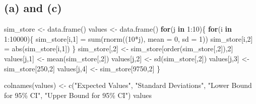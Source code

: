 \documentclass[
]{article}
\author{}
\date{\vspace{-2.5em}}
\newenvironment{Shaded}{\begin{snugshade}}{\end{snugshade}}
\newcommand{\AttributeTok}[1]{\textcolor[rgb]{0.77,0.63,0.00}{#1}}
\newcommand{\ControlFlowTok}[1]{\textcolor[rgb]{0.13,0.29,0.53}{\textbf{#1}}}
\newcommand{\DecValTok}[1]{\textcolor[rgb]{0.00,0.00,0.81}{#1}}
\newcommand{\FunctionTok}[1]{\textcolor[rgb]{0.00,0.00,0.00}{#1}}
\newcommand{\NormalTok}[1]{#1}
\newcommand{\OtherTok}[1]{\textcolor[rgb]{0.56,0.35,0.01}{#1}}
\newcommand{\SpecialCharTok}[1]{\textcolor[rgb]{0.00,0.00,0.00}{#1}}
\newcommand{\StringTok}[1]{\textcolor[rgb]{0.31,0.60,0.02}{#1}}
\begin{document}
\subsection*{(a) and (c)}

\begin{Shaded}
\begin{Highlighting}[]
\NormalTok{sim\_store }\OtherTok{\textless{}{-}} \FunctionTok{data.frame}\NormalTok{()}
\NormalTok{values }\OtherTok{\textless{}{-}} \FunctionTok{data.frame}\NormalTok{()}
\ControlFlowTok{for}\NormalTok{(j }\ControlFlowTok{in} \DecValTok{1}\SpecialCharTok{:}\DecValTok{10}\NormalTok{)\{}
  \ControlFlowTok{for}\NormalTok{(i }\ControlFlowTok{in} \DecValTok{1}\SpecialCharTok{:}\DecValTok{10000}\NormalTok{)\{}
\NormalTok{    sim\_store[i,}\DecValTok{1}\NormalTok{] }\OtherTok{=} \FunctionTok{sum}\NormalTok{(}\FunctionTok{rnorm}\NormalTok{((}\DecValTok{10}\SpecialCharTok{*}\NormalTok{j), }\AttributeTok{mean =} \DecValTok{0}\NormalTok{, }\AttributeTok{sd =} \DecValTok{1}\NormalTok{))}
\NormalTok{    sim\_store[i,}\DecValTok{2}\NormalTok{] }\OtherTok{=} \FunctionTok{abs}\NormalTok{(sim\_store[i,}\DecValTok{1}\NormalTok{])}
\NormalTok{  \}}
\NormalTok{  sim\_store[,}\DecValTok{2}\NormalTok{] }\OtherTok{\textless{}{-}}\NormalTok{ sim\_store[}\FunctionTok{order}\NormalTok{(sim\_store[,}\DecValTok{2}\NormalTok{]),}\DecValTok{2}\NormalTok{]}
\NormalTok{  values[j,}\DecValTok{1}\NormalTok{] }\OtherTok{\textless{}{-}} \FunctionTok{mean}\NormalTok{(sim\_store[,}\DecValTok{2}\NormalTok{])}
\NormalTok{  values[j,}\DecValTok{2}\NormalTok{] }\OtherTok{\textless{}{-}} \FunctionTok{sd}\NormalTok{(sim\_store[,}\DecValTok{2}\NormalTok{])}
\NormalTok{  values[j,}\DecValTok{3}\NormalTok{] }\OtherTok{\textless{}{-}}\NormalTok{ sim\_store[}\DecValTok{250}\NormalTok{,}\DecValTok{2}\NormalTok{]}
\NormalTok{  values[j,}\DecValTok{4}\NormalTok{] }\OtherTok{\textless{}{-}}\NormalTok{ sim\_store[}\DecValTok{9750}\NormalTok{,}\DecValTok{2}\NormalTok{]}
\NormalTok{\}}

\FunctionTok{colnames}\NormalTok{(values) }\OtherTok{\textless{}{-}} \FunctionTok{c}\NormalTok{(}\StringTok{"Expected Values"}\NormalTok{, }\StringTok{"Standard Deviations"}\NormalTok{,}
                      \StringTok{"Lower Bound for 95\% CI"}\NormalTok{, }\StringTok{"Upper Bound for 95\% CI"}\NormalTok{)}
\NormalTok{values}
\end{Highlighting}
\end{Shaded}
\end{document}
